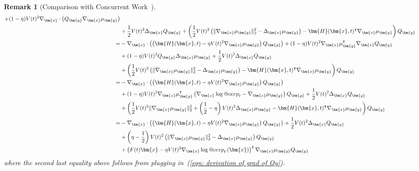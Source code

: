 \documentclass{article}
\makeatletter
\numberwithin{equation}{section}
\newtheorem{remark}[theorem]{Remark}
\def\eqref#1{(\ref{#1})}
\def\vx{{\bm{x}}}
\def\vy{{\bm{y}}}
\def\mH{{\bm{H}}}
\DeclareRobustCommand{\cev}[1]{%
  {\mathpalette\do@cev{#1}}%
}
\newcommand{\do@cev}[2]{%
  \vbox{\offinterlineskip
    \sbox\z@{$\m@th#1 x$}%
    \ialign{##\cr
      \hidewidth\reflectbox{$\m@th#1\vec{}\mkern4mu$}\hidewidth\cr
      \noalign{\kern-\ht\z@}
      $\m@th#1#2$\cr
    }%
  }%
}
\makeatother
\begin{document}
\begin{remark}[Comparison with Concurrent Work~\cite{skreta2025feynman}]
\begin{equation}
\begin{aligned}
            + (1-\eta)V(t)^2\nabla_{\vx} \cdot \left(Q_{\vy}\nabla_{\vx}\mu_{\vy}\right)\\
            &+\frac{1}{2}V(t)^2\Delta_{\vx}Q_{\vy} +\left(\frac{1}{2}V(t)^2\left(\|\nabla_{\vx}\mu_{\vy}\|_2^2-\Delta_{\vx}\mu_{\vy}\right) - \mH(\vx,t)^\intercal\nabla_{\vx}\mu_{\vy}\right)Q_{\vy}\\
            = &-\nabla_{\vx} \cdot \left(\left(\mH(\vx,t)-\eta V(t)^2\nabla_{\vx}\mu_{\vy}\right)Q_{\vy}\right)
            + (1-\eta)V(t)^2 \nabla_{\vx}\mu_{\vy}^\intercal \nabla_{\vx}Q_{\vy}\\
            &+ (1-\eta)V(t)^2Q_{\vy}\Delta_{\vx}\mu_{\vy} +\frac{1}{2}V(t)^2\Delta_{\vx}Q_{\vy} \\
            &+\left(\frac{1}{2}V(t)^2\left(\|\nabla_{\vx}\mu_{\vy}\|_2^2-\Delta_{\vx}\mu_{\vy}\right) - \mH(\vx,t)^\intercal\nabla_{\vx}\mu_{\vy}\right)Q_{\vy}\\
            = &-\nabla_{\vx} \cdot \left(\left(\mH(\vx,t)-\eta V(t)^2\nabla_{\vx}\mu_{\vy}\right)Q_{\vy}\right)\\
            &+ (1-\eta)V(t)^2 \nabla_{\vx}\mu_{\vy}^\intercal \left(\nabla_{\vx}\log \cev{p}_t - \nabla_{\vx}\mu_{\vy}\right)Q_{\vy} + \frac{1}{2}V(t)^2\Delta_{\vx}Q_{\vy} \\
            &+\left(\frac{1}{2}V(t)^2\|\nabla_{\vx}\mu_{\vy}\|_2^2+\left(\frac{1}{2}-\eta\right)V(t)^2\Delta_{\vx}\mu_{\vy} - \mH(\vx,t)^\intercal\nabla_{\vx}\mu_{\vy}\right)Q_{\vy}\\
            = &-\nabla_{\vx} \cdot \left(\left(\mH(\vx,t)-\eta V(t)^2\nabla_{\vx}\mu_{\vy}\right)Q_{\vy}\right)+ \frac{1}{2}V(t)^2\Delta_{\vx}Q_{\vy} \\
            &+\left(\eta -\frac{1}{2}\right)V(t)^2\left(\|\nabla_{\vx}\mu_{\vy}\|_2^2-\Delta_{\vx}\mu_{\vy}\right)Q_{\vy}\\
            &+\left(F(t)\vx -\eta V(t)^2 \nabla_{\vx}\log \cev{p}_t\left(\vx\right)\right)^\intercal\nabla_{\vx}\mu_{\vy}  Q_{\vy}
        \end{aligned}    
    \end{equation}
    where the second last equality above follows from plugging in~\eqref{eqn: derivation of grad of Qy}. 
    

\end{remark}
\end{document}
